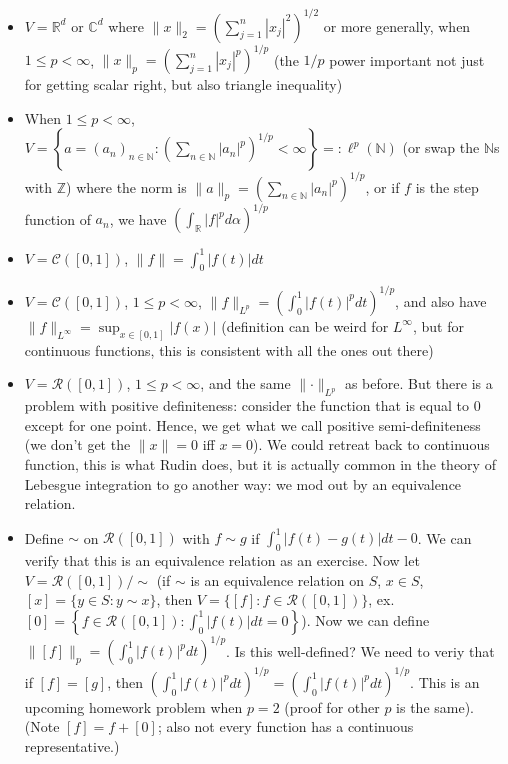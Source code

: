 \documentclass{article}
\theoremstyle{plain}
\theoremstyle{remark}
\newcommand{\N}{{\mathbb N}}
\newcommand{\Z}{{\mathbb Z}}
\newcommand{\R}{{\mathbb R}}
\newcommand{\C}{{\mathbb C}}
\begin{document}
\begin{itemize}
	\item $V = \R^d$ or $\C^d$ where $\lVert x \rVert_2 = \left(\sum_{j=1}^n |x_j|^2\right)^{1/2}$
		or more generally, when $1 \leq p < \infty$,
		$\lVert x \rVert_p = \left(\sum_{j=1}^n |x_j|^p\right)^{1/p}$
		(the $1/p$ power important not just for getting scalar right,
		but also triangle inequality)
	\item When $1 \leq p < \infty$,
		$V = \left\{a = (a_n)_{n\in\N} \colon
		\left( \sum_{n \in \N} |a_n|^p\right)^{1/p} < \infty\right\}
		=: \ell^p(\N)$ (or swap the $\N$s with $\Z$) where the norm is
		$\lVert a \rVert_p = \left(\sum_{n\in\N} |a_n|^p\right)^{1/p}$,
		or if $f$ is the step function of $a_n$, we have $\left(\int_\R |f|^pd\alpha\right)^{1/p}$
	\item $V = \mathcal{C}([0,1])$, $\lVert f \rVert = \int_0^1 |f(t)|dt$
	\item $V = \mathcal{C}([0,1])$, $1 \leq p < \infty$,
		$\lVert f \rVert_{L^p} = \left(\int_0^1 |f(t)|^pdt \right)^{1/p}$,
		and also have $\lVert f \rVert_{L^\infty} = \sup_{x \in [0,1]}|f(x)|$
		(definition can be weird for $L^\infty$, but for continuous functions,
		this is consistent with all the ones out there)
	\item $V = \mathcal{R}([0,1])$, $1 \leq p < \infty$,
		and the same $\lVert \cdot \rVert_{L^p}$ as before.
		But there is a problem with positive definiteness:
		consider the function that is equal to $0$ except for one point.
		Hence, we get what we call positive semi-definiteness
		(we don't get the $\lVert x \rVert = 0$ iff $x = 0$).
		We could retreat back to continuous function, this is what Rudin does,
		but it is actually common in the theory of Lebesgue integration to go another way:
		we mod out by an equivalence relation.
	\item Define $\sim$ on $\mathcal{R}([0,1])$ with $f \sim g$ if
		$\int_0^1 | f(t) - g(t)|dt - 0$.
		We can verify that this is an equivalence relation as an exercise.
		Now let $V = \mathcal{R}([0,1])/\sim$
		(if $\sim$ is an equivalence relation on $S$, $x \in S$,
		$[x] = \{y \in S \colon y \sim x\}$,
		then $V = \{[f] \colon f \in \mathcal{R}([0,1])\}$,
		ex. $[0] = \left\{f \in \mathcal{R}([0,1]) \colon \int_0^1 |f(t)|dt = 0\right\}$).
		Now we can define $\lVert [f] \rVert_p = \left(\int_0^1 |f(t)|^pdt\right)^{1/p}$.
		Is this well-defined?
		We need to veriy that if $[f] = [g]$, then
		$\left(\int_0^1 |f(t)|^p dt\right)^{1/p} = \left(\int_0^1 |f(t)|^p dt\right)^{1/p}$.
		This is an upcoming homework problem when $p = 2$ (proof for other $p$ is the same).
		(Note $[f] = f + [0]$; also not every function has a continuous representative.)
\end{itemize}
\end{document}
